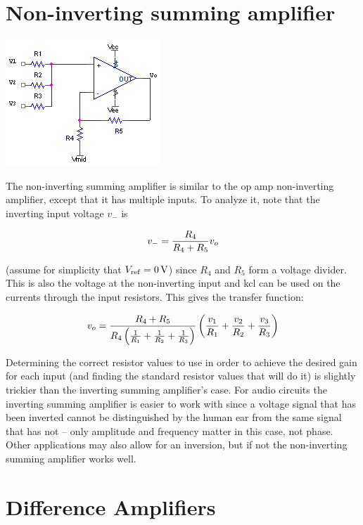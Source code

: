 \section{Non-inverting summing amplifier}
\begin{center}
	\includegraphics{schematics/summingamp.PNG}
\end{center}
The non-inverting summing amplifier is similar to the op amp non-inverting amplifier, except that it has multiple inputs. To analyze it, note that the inverting input voltage $v_{-}$ is

\begin{equation}
v_{-} = \frac{R_4}{R_4+R_5}v_o
\end{equation}

\noindent (assume for simplicity that $V\sub{ref} = \SI{0}{\V}$) since $R_4$ and $R_5$ form a voltage divider.
This is also the voltage at the non-inverting input and \ac{kcl} can be used on the currents through the input resistors.
This gives the transfer function:

\textcolor{red}{
\begin{equation}
v_o = \frac{R_4+R_5}{R_4\left(\frac{1}{R_1} + \frac{1}{R_2} + \frac{1}{R_3}\right)}\left(\frac{v_1}{R_1} + \frac{v_2}{R_2} + \frac{v_3}{R_3}\right)
\label{eq:summingamp}
\end{equation}
}

Determining the correct resistor values to use in order to achieve the desired gain for each input (and finding the standard resistor values that will do it) is slightly trickier than the inverting summing amplifier's case.
For audio circuits the inverting summing amplifier is easier to work with since a voltage signal that has been inverted cannot be distinguished by the human ear from the same signal that has not -- only amplitude and frequency matter in this case, not phase.
Other applications may also allow for an inversion, but if not the non-inverting summing amplifier works well.

\section{Difference Amplifiers}


